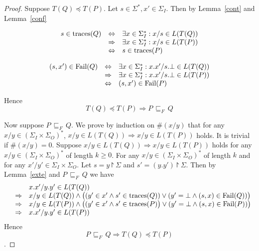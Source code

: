\begin{proof}
Suppose $T(Q)\preceq  T(P)$. Let $s\in \Sigma^*, x'\in \Sigma_I$. Then by Lemma~\ref{cont} and Lemma~\ref{conf}

\[\begin{array}{lll}
 s\in \text{traces}(Q) &\Leftrightarrow & \exists x\in \Sigma_I^*: x/s\in L(T(Q))\\
&\Rightarrow& \exists x\in \Sigma_I^*:  x/s\in  L(T(P))\\
&\Leftrightarrow &s\in \text{traces}(P)\\
\end{array}
\]

\[\begin{array}{lll}
(s,   x')\in {\text {\rm Fail}}(Q) &\Leftrightarrow & \exists x\in \Sigma_I^*: x.x'/s.\bot \in L(T(Q))\\
&\Rightarrow& \exists x\in \Sigma_I^*: x.x'/s.\bot \in L(T(P))\\
&\Leftrightarrow &(s,   x')\in {\text {\rm Fail}}(P)\\
\end{array}
\]

Hence $$T(Q)\preceq  T(P)\Rightarrow P\,\sqsubseteq_F\, Q$$

Now suppose $P\,\sqsubseteq_F\, Q$. We prove by induction on $\#(x/y)$ that for any $x/y\in (\Sigma_I\times \Sigma_O)^*$,  $x/y\in L(T(Q))\Rightarrow x/y\in L(T(P))$ holds.
It is trivial if $\#(x/y)=0$. Suppose $x/y\in L(T(Q))\Rightarrow x/y\in L(T(P))$ holds for any $x/y\in (\Sigma_I\times \Sigma_O)^*$ of length $k\ge 0$.
For any $x/y\in (\Sigma_I\times \Sigma_O)^*$ of length $k$ and for any   $x'/y'\in \Sigma_I\times \Sigma_O$. Let $s=y\project \Sigma$ and $s'=(y.y')\project \Sigma$. Then by Lemma~\ref{exte} and $ P\,\sqsubseteq_F\, Q$ we have
\[\begin{array}{lll}
&&x.x'/y.y'\in L(T(Q))\\&\Rightarrow& x/y\in L(T(Q))\wedge \big((y'\in x'\wedge s'\in \text{traces}(Q))\vee (y'=\bot\wedge (s, x)\in {\text {\rm Fail}}(Q))\big)\\
&\Rightarrow& x/y\in L(T(P))\wedge \big((y'\in x'\wedge s'\in \text{traces}(P)\big)\vee (y'=\bot\wedge (s, x)\in {\text {\rm Fail}}(P))\big)\\
 &\Rightarrow& x.x'/y.y'\in L(T(P)) \\
\end{array}
\]
Hence $$ P\,\sqsubseteq_F\, Q \Rightarrow T(Q)\preceq  T(P)$$.
\end{proof}


